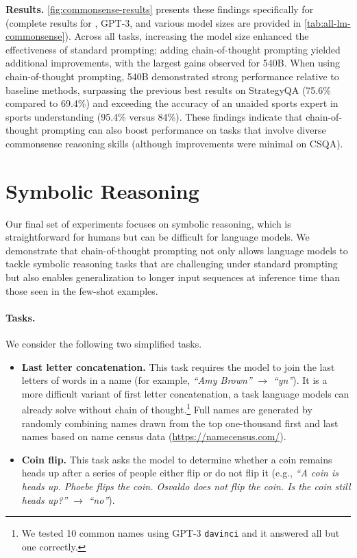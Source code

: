 \textbf{Results.} 
\cref{fig:commonsense-results} presents these findings specifically for \palm{} (complete results for \lamda{}, GPT-3, and various model sizes are provided in \cref{tab:all-lm-commonsense}). 
Across all tasks, increasing the model size enhanced the effectiveness of standard prompting; adding chain-of-thought prompting yielded additional improvements, with the largest gains observed for \palm{} 540B. When using chain-of-thought prompting, \palm{} 540B demonstrated strong performance relative to baseline methods, surpassing the previous best results on StrategyQA (75.6\% compared to 69.4\%) and exceeding the accuracy of an unaided sports expert in sports understanding (95.4\% versus 84\%). 
These findings indicate that chain-of-thought prompting can also boost performance on tasks that involve diverse commonsense reasoning skills (although improvements were minimal on CSQA).




\section{Symbolic Reasoning}\label{sec:symbolic-reasoning} 
Our final set of experiments focuses on symbolic reasoning, which is straightforward for humans but can be difficult for language models. We demonstrate that chain-of-thought prompting not only allows language models to tackle symbolic reasoning tasks that are challenging under standard prompting but also enables generalization to longer input sequences at inference time than those seen in the few-shot examples.

\paragraph{Tasks.} 
We consider the following two simplified tasks.

\begin{itemize}[leftmargin=*,topsep=0pt]
    \itemsep0em \item \textbf{Last letter concatenation.} This task requires the model to join the last letters of words in a name (for example, \textit{``Amy Brown''} $\rightarrow$ \textit{``yn''}). 
    It is a more difficult variant of first letter concatenation, a task language models can already solve without chain of thought.\footnote{We tested 10 common names using GPT-3 \texttt{davinci} and it answered all but one correctly.} Full names are generated by randomly combining names drawn from the top one-thousand first and last names based on name census data ({\small{\url{https://namecensus.com/}}}).
    \item \textbf{Coin flip.} This task asks the model to determine whether a coin remains heads up after a series of people either flip or do not flip it (e.g., \textit{``A coin is heads up. Phoebe flips the coin. Osvaldo does not flip the coin. Is the coin still heads up?''} $\rightarrow$ \textit{``no''}).
\end{itemize}

